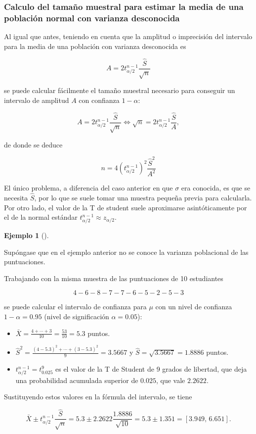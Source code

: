 \documentclass[
  spanish,
  a4paper,
]{scrreport}
\providecommand{\tightlist}{%
  \setlength{\itemsep}{0pt}\setlength{\parskip}{0pt}}
\theoremstyle{plain}
\theoremstyle{definition}
\newtheorem{example}{Ejemplo}[chapter]
\theoremstyle{definition}
\theoremstyle{remark}
\begin{document}
\subsubsection{Calculo del tamaño muestral para estimar la media de una
población normal con varianza
desconocida}\label{calculo-del-tamauxf1o-muestral-para-estimar-la-media-de-una-poblaciuxf3n-normal-con-varianza-desconocida}

Al igual que antes, teniendo en cuenta que la amplitud o imprecisión del
intervalo para la media de una población con varianza desconocida es

\[
A= 2 t^{n-1}_{\alpha/2}\frac{\hat{S}}{\sqrt{n}}
\]

se puede calcular fácilmente el tamaño muestral necesario para conseguir
un intervalo de amplitud \(A\) con confianza \(1-\alpha\):

\[
A= 2 t^{n-1}_{\alpha/2}\frac{\hat{S}}{\sqrt{n}} \Leftrightarrow \sqrt{n}= 2 t^{n-1}_{\alpha/2}\frac{\hat{S}}{A},
\]

de donde se deduce

\[
{n = 4 (t^{n-1}_{\alpha/2})^2\frac{\hat{S}^2}{A^2}}
\]

El único problema, a diferencia del caso anterior en que \(\sigma\) era
conocida, es que se necesita \(\hat{S}\), por lo que se suele tomar una
muestra pequeña previa para calcularla. Por otro lado, el valor de la T
de student suele aproximarse asintóticamente por el de la normal
estándar \(t^{n-1}_{\alpha/2}\approx z_{\alpha/2}\).

\begin{example}[]\protect\hypertarget{exm-intervalo-confianza-media-normal-varianza-desconocida}{}\label{exm-intervalo-confianza-media-normal-varianza-desconocida}

Supóngase que en el ejemplo anterior no se conoce la varianza
poblacional de las puntuaciones.

Trabajando con la misma muestra de las puntuaciones de 10 estudiantes

\[
4 - 6 - 8 - 7 - 7 - 6 - 5 - 2 - 5 - 3
\]

se puede calcular el intervalo de confianza para \(\mu\) con un nivel de
confianza \(1-\alpha=0.95\) (nivel de significación \(\alpha=0.05\)):

\begin{itemize}
\tightlist
\item
  \(\bar X = \frac{4+\cdots+3}{10}= \frac{53}{10} = 5.3\) puntos.
\item
  \(\hat{S}^2= \frac{(4-5.3)^2+\cdots+(3-5.3)^2}{9} = 3.5667\) y
  \(\hat{S}=\sqrt{3.5667}=1.8886\) puntos.
\item
  \(t^{n-1}_{\alpha/2}=t^9_{0.025}\) es el valor de la T de Student de 9
  grados de libertad, que deja una probabilidad acumulada superior de
  \(0.025\), que vale \(2.2622\).
\end{itemize}

Sustituyendo estos valores en la fórmula del intervalo, se tiene

\[
\bar{X}\pm t^{n-1}_{\alpha/2}\frac{\hat{S}}{\sqrt{n}} = 5.3\pm 2.2622\frac{1.8886}{\sqrt{10}} = 5.3\pm 1.351 = \left[3.949,\,6.651\right].
\]

\end{example}
\end{document}

